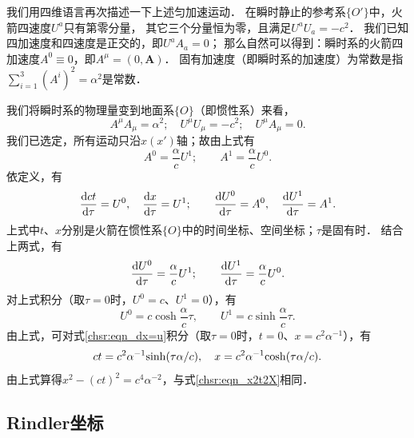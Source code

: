 

{\kaishu 我们用四维语言再次描述一下上述匀加速运动}．
在瞬时静止的参考系$\{O'\}$中，火箭四速度$U^a$只有第零分量，
其它三个分量恒为零，且满足$U^a U_a =-c^2$．
我们已知四加速度和四速度是正交的，即$U^a A_a =0$；
那么自然可以得到：瞬时系的火箭四加速度$A^0\equiv 0$，即$A^\mu=(0,\boldsymbol{A})$．
固有加速度（即瞬时系的加速度）为常数是指$\sum_{i=1}^{3}(A^i)^2 = \alpha^2$是常数．

我们将瞬时系的物理量变到地面系$\{O\}$（即惯性系）来看，
\begin{equation}
    A^\mu A_\mu = \alpha^2; \quad
    U^\mu U_\mu = -c^2; \quad
    U^\mu A_\mu = 0. 
\end{equation}
我们已选定，所有运动只沿$x(x')$轴；故由上式有
\begin{equation}
    A^0=\frac{\alpha}{c} U^1; \qquad    A^1=\frac{\alpha}{c} U^0.
\end{equation}
依定义，有
\begin{equation}\label{chsr:eqn_dx=u}
    \frac{{\rm d}ct}{{\rm d}\tau} = U^0,\quad
    \frac{{\rm d}x}{{\rm d}\tau} = U^1;\qquad
    \frac{{\rm d}U^0}{{\rm d}\tau} = A^0,\quad
    \frac{{\rm d}U^1}{{\rm d}\tau} = A^1 .
\end{equation}
上式中$t$、$x$分别是火箭在惯性系$\{O\}$中的时间坐标、空间坐标；$\tau$是固有时．
结合上两式，有
\begin{equation}
    \frac{{\rm d}U^0}{{\rm d}\tau}= \frac{\alpha}{c} U^1; \qquad
    \frac{{\rm d}U^1}{{\rm d}\tau}= \frac{\alpha}{c} U^0.
\end{equation}
对上式积分（取$\tau=0$时，$U^0=c$、$U^1=0$），有
\begin{equation}
    U^0 = c \cosh \frac{\alpha}{c} \tau ,\qquad
    U^1 = c \sinh \frac{\alpha}{c} \tau .
\end{equation}
由上式，可对式\eqref{chsr:eqn_dx=u}积分（取$\tau=0$时，$t=0$、$x=c^2 \alpha^{-1}$），有
\begin{equation}\label{chsr:eqn_tx-sh-ch}
    ct=c^2 \alpha^{-1} {\rm sinh}(\tau \alpha/c),\quad
    x =c^2 \alpha^{-1} {\rm cosh}(\tau \alpha/c).
\end{equation}
由上式算得$x^2-(ct)^2=c^4 \alpha^{-2}$，与式\eqref{chsr:eqn_x2t2X}相同．




\subsection{Rindler坐标}\label{chsr:sec_Rindler-space}

